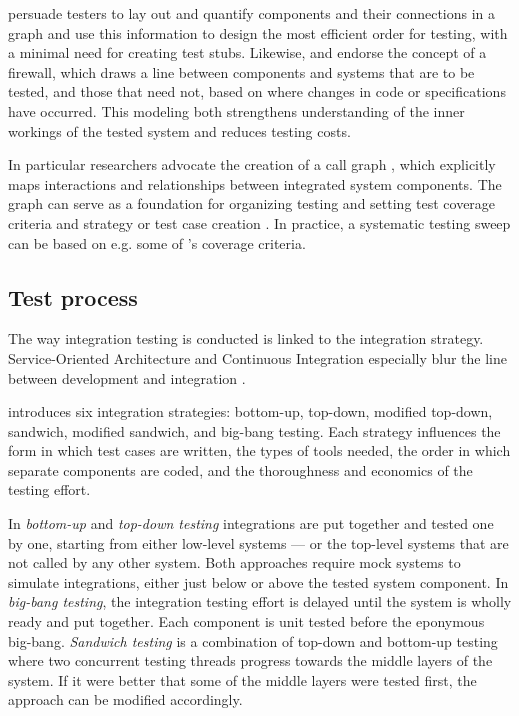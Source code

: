 \documentclass[12pt,a4paper,oneside,pdftex]{report}
\begin{document}

\citet{hewett2009automated} persuade testers to lay out and quantify components and their connections in a graph and use this information to design the most efficient order for testing, with a minimal need for creating test stubs. Likewise, \citet{leung1990study} and \citet{abdullah1995correcting} endorse the concept of a firewall, which draws a line between components and systems that are to be tested, and those that need not, based on where changes in code or specifications have occurred. This modeling both strengthens understanding of the inner workings of the tested system and reduces testing costs.

In particular researchers advocate the creation of a call graph \citep{leung1990study, hurlburt2012not, linnenkugel1990test}, which explicitly maps interactions and relationships between integrated system components. The graph can serve as a foundation for organizing testing and setting test coverage criteria and strategy or test case creation \citep{benz2007combining, hura2011method, linnenkugel1990test}. In practice, a systematic testing sweep can be based on e.g. some of \citeauthor{linnenkugel1990test}'s \citeyearpar{linnenkugel1990test} coverage criteria. 

\subsection{Test process}
The way integration testing is conducted is linked to the integration strategy. Service-Oriented Architecture and Continuous Integration especially blur the line between development and integration \citep{huang2008surrogate, wieczorek2010model}. 

\citet{myers1976software} introduces six integration strategies: bottom-up, top-down, modified top-down, sandwich, modified sandwich, and big-bang testing. Each strategy influences the form in which test cases are written, the types of tools needed, the order in which separate components are coded, and the thoroughness and economics of the testing effort. 

In \emph{bottom-up} and \emph{top-down testing} integrations are put together and tested one by one, starting from either low-level systems --- or the top-level systems that are not called by any other system. Both approaches require mock systems to simulate integrations, either just below or above the tested system component. In \emph{big-bang testing}, the integration testing effort is delayed until the system is wholly ready and put together. Each component is unit tested before the eponymous big-bang. \emph{Sandwich testing} is a combination of top-down and bottom-up testing where two concurrent testing threads progress towards the middle layers of the system. If it were better that some of the middle layers were tested first, the approach can be modified accordingly. \citep{burnstein2003practical, myers1976software}
\end{document}
